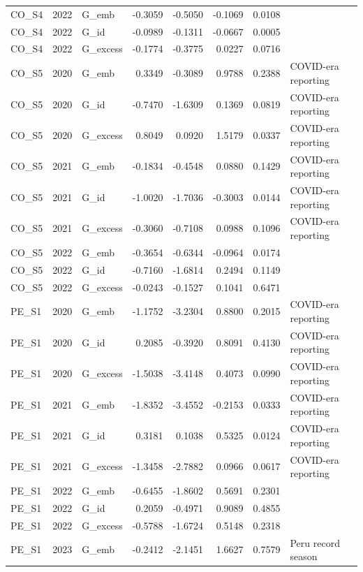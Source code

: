 \begin{tabular}{lllrrrrl}
CO\_S4 & 2022 & G\_emb & -0.3059 & -0.5050 & -0.1069 & 0.0108 &  \\
CO\_S4 & 2022 & G\_id & -0.0989 & -0.1311 & -0.0667 & 0.0005 &  \\
CO\_S4 & 2022 & G\_excess & -0.1774 & -0.3775 & 0.0227 & 0.0716 &  \\
CO\_S5 & 2020 & G\_emb & 0.3349 & -0.3089 & 0.9788 & 0.2388 & COVID-era reporting \\
CO\_S5 & 2020 & G\_id & -0.7470 & -1.6309 & 0.1369 & 0.0819 & COVID-era reporting \\
CO\_S5 & 2020 & G\_excess & 0.8049 & 0.0920 & 1.5179 & 0.0337 & COVID-era reporting \\
CO\_S5 & 2021 & G\_emb & -0.1834 & -0.4548 & 0.0880 & 0.1429 & COVID-era reporting \\
CO\_S5 & 2021 & G\_id & -1.0020 & -1.7036 & -0.3003 & 0.0144 & COVID-era reporting \\
CO\_S5 & 2021 & G\_excess & -0.3060 & -0.7108 & 0.0988 & 0.1096 & COVID-era reporting \\
CO\_S5 & 2022 & G\_emb & -0.3654 & -0.6344 & -0.0964 & 0.0174 &  \\
CO\_S5 & 2022 & G\_id & -0.7160 & -1.6814 & 0.2494 & 0.1149 &  \\
CO\_S5 & 2022 & G\_excess & -0.0243 & -0.1527 & 0.1041 & 0.6471 &  \\
PE\_S1 & 2020 & G\_emb & -1.1752 & -3.2304 & 0.8800 & 0.2015 & COVID-era reporting \\
PE\_S1 & 2020 & G\_id & 0.2085 & -0.3920 & 0.8091 & 0.4130 & COVID-era reporting \\
PE\_S1 & 2020 & G\_excess & -1.5038 & -3.4148 & 0.4073 & 0.0990 & COVID-era reporting \\
PE\_S1 & 2021 & G\_emb & -1.8352 & -3.4552 & -0.2153 & 0.0333 & COVID-era reporting \\
PE\_S1 & 2021 & G\_id & 0.3181 & 0.1038 & 0.5325 & 0.0124 & COVID-era reporting \\
PE\_S1 & 2021 & G\_excess & -1.3458 & -2.7882 & 0.0966 & 0.0617 & COVID-era reporting \\
PE\_S1 & 2022 & G\_emb & -0.6455 & -1.8602 & 0.5691 & 0.2301 &  \\
PE\_S1 & 2022 & G\_id & 0.2059 & -0.4971 & 0.9089 & 0.4855 &  \\
PE\_S1 & 2022 & G\_excess & -0.5788 & -1.6724 & 0.5148 & 0.2318 &  \\
PE\_S1 & 2023 & G\_emb & -0.2412 & -2.1451 & 1.6627 & 0.7579 & Peru record season \\

\end{tabular}
